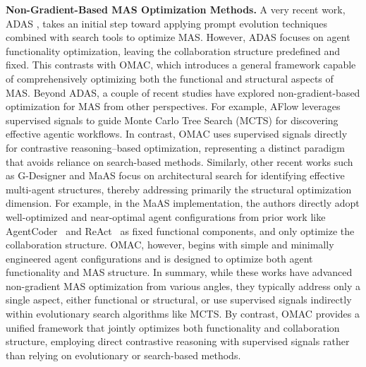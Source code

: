 \noindent \textbf{Non-Gradient-Based MAS Optimization Methods.} A very recent work, ADAS \cite{hu2024automated}, takes an initial step toward applying prompt evolution techniques combined with search tools to optimize MAS. However, ADAS focuses on agent functionality optimization, leaving the collaboration structure predefined and fixed. This contrasts with OMAC, which introduces a general framework capable of comprehensively optimizing both the functional and structural aspects of MAS. Beyond ADAS, a couple of recent studies have explored non-gradient-based optimization for MAS from other perspectives. For example, AFlow \cite{aflow} leverages supervised signals to guide Monte Carlo Tree Search (MCTS) for discovering effective agentic workflows. 
In contrast, OMAC uses supervised signals directly for contrastive reasoning–based optimization, representing a distinct paradigm that avoids reliance on search-based methods. Similarly, other recent works such as G-Designer \cite{zhang2025g} and MaAS \cite{zhang2025multi} focus on architectural search for identifying effective multi-agent structures, thereby addressing primarily the structural optimization dimension. 
For example, in the MaAS implementation, the authors directly adopt well-optimized and near-optimal agent configurations from prior work like AgentCoder~\cite{huang2023agentcoder} and ReAct~\cite{yao2023react} as fixed functional components, and only optimize the collaboration structure. OMAC, however, begins with simple and minimally engineered agent configurations and is designed to optimize both agent functionality and MAS structure. 
In summary, while these works have advanced non-gradient MAS optimization from various angles, they typically address only a single aspect, either functional or structural, or use supervised signals indirectly within evolutionary search algorithms like MCTS. By contrast, OMAC provides a unified framework that jointly optimizes both functionality and collaboration structure, employing direct contrastive reasoning with supervised signals rather than relying on evolutionary or search-based methods.